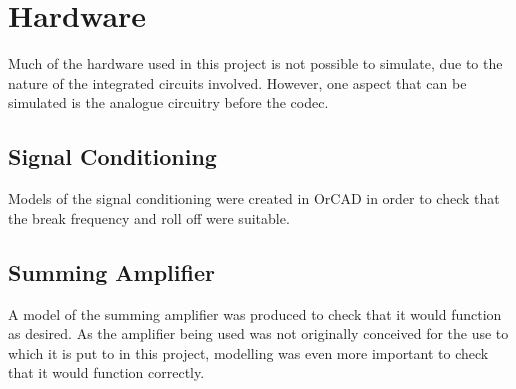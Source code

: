 \section{Hardware}
Much of the hardware used in this project is not possible to simulate, due to
the nature of the integrated circuits involved.
However, one aspect that can be simulated is the analogue circuitry before the
codec.

\subsection{Signal Conditioning}
Models of the signal conditioning were created in OrCAD in order to check that
the break frequency and roll off were suitable.

\subsection{Summing Amplifier}
A model of the summing amplifier was produced to check that it would function
as desired.
As the amplifier being used was not originally conceived for the use to which
it is put to in this project, modelling was even more important to check that
it would function correctly.
